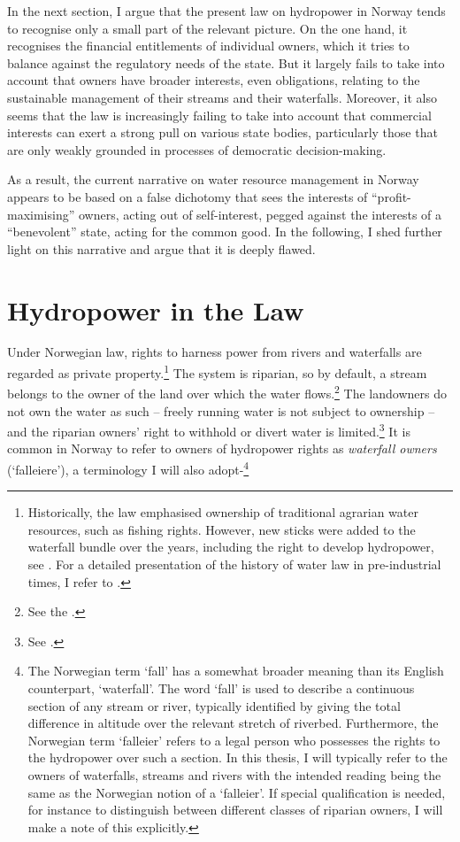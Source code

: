 In the next section, I argue that the present law on hydropower in Norway tends to recognise only a small part of the relevant picture. On the one hand, it recognises the financial entitlements of individual owners, which it tries to balance against the regulatory needs of the state. But it largely fails to take into account that owners have broader interests, even obligations, relating to the sustainable management of their streams and their waterfalls. Moreover, it also seems that the law is increasingly failing to take into account that commercial interests can exert a strong pull on various state bodies, particularly those that are only weakly grounded in processes of democratic decision-making.

As a result, the current narrative on water resource management in Norway appears to be based on a false dichotomy that sees the interests of ``profit-maximising'' owners, acting out of self-interest, pegged against the interests of a ``benevolent'' state, acting for the common good. In the following, I shed further light on this narrative and argue that it is deeply flawed.

\section{Hydropower in the Law}\label{sec:4:3}

Under Norwegian law, rights to harness power from rivers and waterfalls are regarded as private property.\footnote{Historically, the law emphasised ownership of traditional agrarian water resources, such as fishing rights. However, new sticks were added to the waterfall bundle over the years, including the right to develop hydropower, see \cite[14-32]{vislie44}. For a detailed presentation of the history of water law in pre-industrial times, I refer to \cite{motzfeld08}.} The system is riparian, so by default, a stream belongs to the owner of the land over which the water flows.\footnote{See the \cite[13]{wra00}.} The landowners do not own the water as such -- freely running water is not subject to ownership -- and the riparian owners' right to withhold or divert water is limited.\footnote{See \cite[8|15]{wra00}.} It is common in Norway to refer to owners of hydropower rights as {\it waterfall owners} (`falleiere'), a terminology I will also adopt-\footnote{The Norwegian term `fall' has a somewhat broader meaning than its English counterpart, `waterfall'. The word `fall' is used to describe a continuous section of any stream or river, typically identified by giving the total difference in altitude over the relevant stretch of riverbed. Furthermore, the Norwegian term `falleier' refers to a legal person who possesses the rights to the hydropower over such a section. In this thesis, I will typically refer to the owners of waterfalls, streams and rivers with the intended reading being the same as the Norwegian notion of a `falleier'. If special qualification is needed, for instance to distinguish between different classes of riparian owners, I will make a note of this explicitly.}


